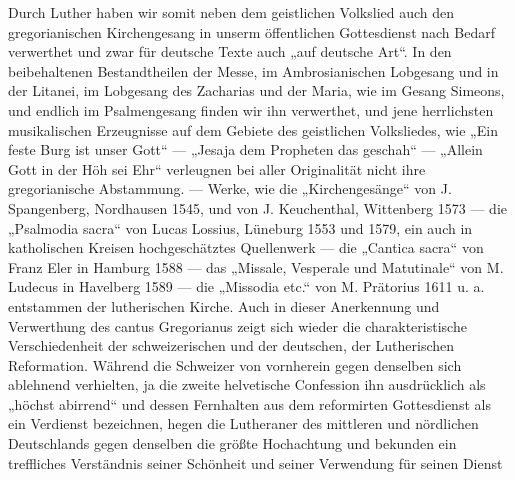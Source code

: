 Durch Luther haben wir somit neben dem geistlichen Volkslied auch den gregorianischen Kirchengesang in unserm öffentlichen Gottesdienst nach Bedarf verwerthet und zwar für deutsche Texte auch „auf deutsche Art“. In den beibehaltenen Bestandtheilen der Messe, im Ambrosianischen Lobgesang und in der Litanei, im Lobgesang des Zacharias und der Maria, wie im Gesang Simeons, und endlich im Psalmengesang finden wir ihn verwerthet, und jene herrlichsten musikalischen Erzeugnisse auf dem Gebiete des geistlichen Volksliedes, wie „Ein feste Burg ist unser Gott“ — „Jesaja dem Propheten das geschah“ — „Allein Gott in der Höh sei Ehr“ verleugnen bei aller Originalität nicht ihre gregorianische Abstammung. — Werke, wie die „Kirchengesänge“ von J. Spangenberg, Nordhausen 1545, und von J. Keuchenthal, Wittenberg 1573 — die „Psalmodia sacra“ von Lucas Lossius, Lüneburg 1553 und 1579, ein auch in katholischen Kreisen hochgeschätztes Quellenwerk — die „Cantica sacra“ von Franz Eler in Hamburg 1588 — das „Missale, Vesperale und Matutinale“ von M. Ludecus in Havelberg 1589 — die „Missodia etc.“ von M. Prätorius 1611 u. a. entstammen der lutherischen Kirche. Auch in dieser Anerkennung und Verwerthung des cantus Gregorianus zeigt sich wieder die charakteristische Verschiedenheit der schweizerischen und der deutschen, der Lutherischen Reformation. Während die Schweizer von vornherein gegen denselben sich ablehnend verhielten, ja die zweite helvetische Confession ihn ausdrücklich als „höchst abirrend“ und dessen Fernhalten aus dem reformirten Gottesdienst als ein Verdienst bezeichnen, hegen die Lutheraner des mittleren und nördlichen Deutschlands gegen denselben die größte Hochachtung und bekunden ein treffliches Verständnis seiner Schönheit und seiner Verwendung für seinen Dienst
